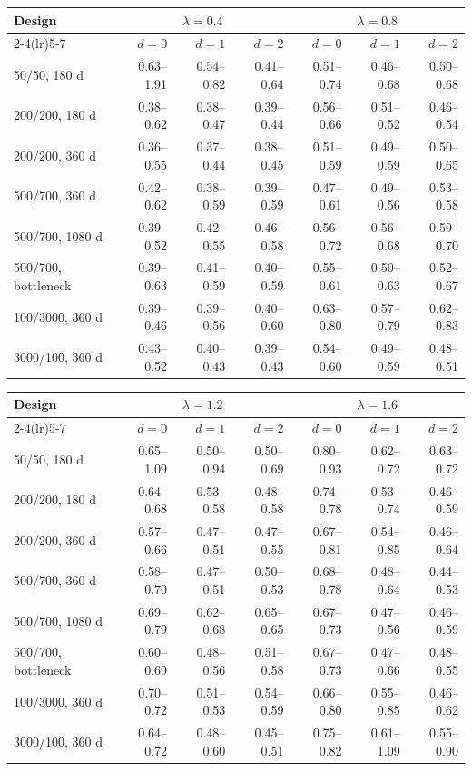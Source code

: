 \begin{center}
\footnotesize
\setlength{\tabcolsep}{3pt}
\begin{tabular}{l*{6}{r}}
\toprule
Design & \multicolumn{3}{c}{$\lambda=0.4$} & \multicolumn{3}{c}{$\lambda=0.8$} \\
\cmidrule(lr){2-4}\cmidrule(lr){5-7}
 & $d=0$ & $d=1$ & $d=2$ & $d=0$ & $d=1$ & $d=2$ \\
\midrule
50/50, 180 d & 0.63--1.91 & 0.54--0.82 & 0.41--0.64 & 0.51--0.74 & 0.46--0.68 & 0.50--0.68 \\
200/200, 180 d & 0.38--0.62 & 0.38--0.47 & 0.39--0.44 & 0.56--0.66 & 0.51--0.52 & 0.46--0.54 \\
200/200, 360 d & 0.36--0.55 & 0.37--0.44 & 0.38--0.45 & 0.51--0.59 & 0.49--0.59 & 0.50--0.65 \\
500/700, 360 d & 0.42--0.62 & 0.38--0.59 & 0.39--0.59 & 0.47--0.61 & 0.49--0.56 & 0.53--0.58 \\
500/700, 1080 d & 0.39--0.52 & 0.42--0.55 & 0.46--0.58 & 0.56--0.72 & 0.56--0.68 & 0.59--0.70 \\
500/700, bottleneck & 0.39--0.63 & 0.41--0.59 & 0.40--0.59 & 0.55--0.61 & 0.50--0.63 & 0.52--0.67 \\
100/3000, 360 d & 0.39--0.46 & 0.39--0.56 & 0.40--0.60 & 0.63--0.80 & 0.57--0.79 & 0.62--0.83 \\
3000/100, 360 d & 0.43--0.52 & 0.40--0.43 & 0.39--0.43 & 0.54--0.60 & 0.49--0.59 & 0.48--0.51 \\
\bottomrule
\end{tabular}
\end{center}

\begin{center}
\footnotesize
\setlength{\tabcolsep}{3pt}
\begin{tabular}{l*{6}{r}}
\toprule
Design & \multicolumn{3}{c}{$\lambda=1.2$} & \multicolumn{3}{c}{$\lambda=1.6$} \\
\cmidrule(lr){2-4}\cmidrule(lr){5-7}
 & $d=0$ & $d=1$ & $d=2$ & $d=0$ & $d=1$ & $d=2$ \\
\midrule
50/50, 180 d & 0.65--1.09 & 0.50--0.94 & 0.50--0.69 & 0.80--0.93 & 0.62--0.72 & 0.63--0.72 \\
200/200, 180 d & 0.64--0.68 & 0.53--0.58 & 0.48--0.58 & 0.74--0.78 & 0.53--0.74 & 0.46--0.59 \\
200/200, 360 d & 0.57--0.66 & 0.47--0.51 & 0.47--0.55 & 0.67--0.81 & 0.54--0.85 & 0.46--0.64 \\
500/700, 360 d & 0.58--0.70 & 0.47--0.51 & 0.50--0.53 & 0.68--0.78 & 0.48--0.64 & 0.44--0.53 \\
500/700, 1080 d & 0.69--0.79 & 0.62--0.68 & 0.65--0.65 & 0.67--0.73 & 0.47--0.56 & 0.46--0.59 \\
500/700, bottleneck & 0.60--0.69 & 0.48--0.56 & 0.51--0.58 & 0.67--0.73 & 0.47--0.66 & 0.48--0.55 \\
100/3000, 360 d & 0.70--0.72 & 0.51--0.53 & 0.54--0.59 & 0.66--0.80 & 0.55--0.85 & 0.46--0.62 \\
3000/100, 360 d & 0.64--0.72 & 0.48--0.60 & 0.45--0.51 & 0.75--0.82 & 0.61--1.09 & 0.55--0.90 \\
\bottomrule
\end{tabular}
\end{center}
